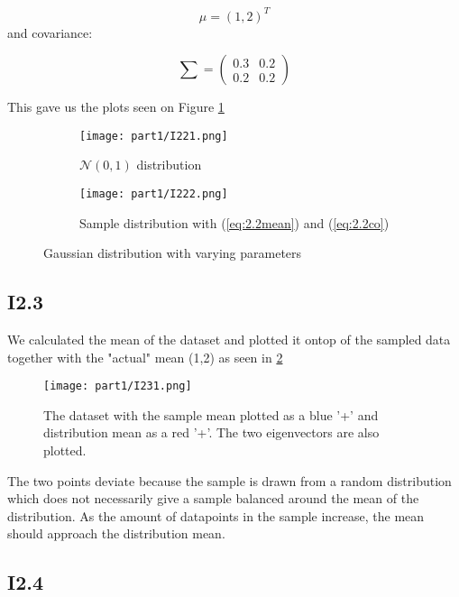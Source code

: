 \documentclass{article}
\begin{document}
\begin{equation}\label{eq:2.2mean}
    \mu = (1,2)^T
\end{equation} 
and covariance:

\begin{equation}\label{eq:2.2co}
    \sum = \left( \begin{array}{cc} 0.3 & 0.2 \\ 0.2 & 0.2 \end{array} \right)
\end{equation}


This gave us the plots seen on Figure \ref{fig:I2.2}

\begin{figure}[!ht]
    \centering
    \begin{subfigure}[b]{0.5\textwidth}
        \texttt{[image: part1/I221.png]}
        \caption{$\mathscr{N}(0,1)$ distribution}
    \end{subfigure}%
    \begin{subfigure}[b]{0.5\textwidth}
        \texttt{[image: part1/I222.png]}
        \caption{Sample distribution with (\ref{eq:2.2mean}) and (\ref{eq:2.2co})}
    \end{subfigure}
    \caption{Gaussian distribution with varying parameters}
    \label{fig:I2.2}
\end{figure}

\subsection{I2.3}


We calculated the mean of the dataset and plotted it ontop of the sampled
data together with the "actual" mean (1,2) as seen in \ref{fig:I3.1}

\begin{figure}[!ht]
    \centering
    \texttt{[image: part1/I231.png]}
    \caption{The dataset with the sample mean plotted as a blue '+' and
    distribution mean as a red '+'. The two eigenvectors are also plotted.}
    \label{fig:I3.1}
\end{figure}

The two points deviate because the sample is drawn from a random
distribution which does not necessarily give a sample balanced around the
mean of the distribution. As the amount of datapoints in the sample
increase, the mean should approach the distribution mean.


\subsection{I2.4}
\end{document}
